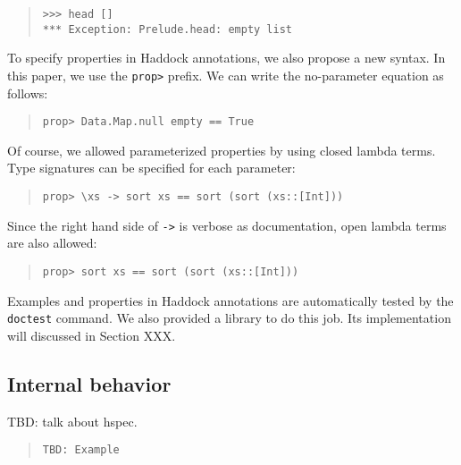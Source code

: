 \documentclass[preprint]{sigplanconf}
\begin{document}
\begin{quote}
\begin{verbatim}
>>> head []
*** Exception: Prelude.head: empty list
\end{verbatim}
\end{quote}

To specify properties in Haddock annotations, we also propose a new syntax. In this paper, we use the {\tt prop>} prefix. We can write the no-parameter equation as follows:

\begin{quote}
\begin{verbatim}
prop> Data.Map.null empty == True
\end{verbatim}
\end{quote}

\noindent Of course, we allowed parameterized properties by
using closed lambda terms.
Type signatures can be specified for each parameter:

\begin{quote}
\begin{verbatim}
prop> \xs -> sort xs == sort (sort (xs::[Int]))
\end{verbatim}
\end{quote}

\noindent Since the right hand side of {\tt ->} is verbose as documentation,
open lambda terms are also allowed:

\begin{quote}
\begin{verbatim}
prop> sort xs == sort (sort (xs::[Int]))
\end{verbatim}
\end{quote}

Examples and properties in Haddock annotations are automatically
tested by the {\tt doctest} command. We also provided a library
to do this job. Its implementation will discussed in Section XXX.

\subsection{Internal behavior}

TBD: talk about hspec.

\begin{quote}
\begin{verbatim}
TBD: Example
\end{verbatim}
\end{quote}

\end{document}
